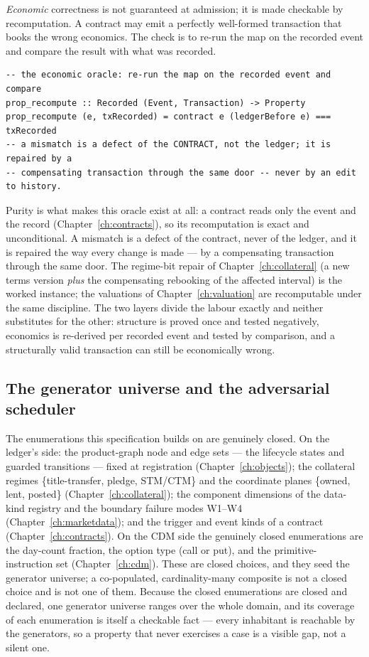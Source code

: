 \emph{Economic} correctness is not guaranteed at admission; it is made checkable by
recomputation. A contract may emit a perfectly well-formed transaction that books the wrong
economics. The check is to re-run the map on the recorded event and compare the result with
what was recorded.

\begin{lstlisting}
-- the economic oracle: re-run the map on the recorded event and compare
prop_recompute :: Recorded (Event, Transaction) -> Property
prop_recompute (e, txRecorded) = contract e (ledgerBefore e) === txRecorded
-- a mismatch is a defect of the CONTRACT, not the ledger; it is repaired by a
-- compensating transaction through the same door -- never by an edit to history.
\end{lstlisting}

Purity is what makes this oracle exist at all: a contract reads only the event and the
record (Chapter~\ref{ch:contracts}), so its recomputation is exact and unconditional. A
mismatch is a defect of the contract, never of the ledger, and it is repaired the way every
change is made --- by a compensating transaction through the same door. The regime-bit
repair of Chapter~\ref{ch:collateral} (a new terms version \emph{plus} the compensating
rebooking of the affected interval) is the worked instance; the valuations of
Chapter~\ref{ch:valuation} are recomputable under the same discipline. The two layers
divide the labour exactly and neither substitutes for the other: structure is proved once
and tested negatively, economics is re-derived per recorded event and tested by comparison,
and a structurally valid transaction can still be economically wrong.

\subsection{The generator universe and the adversarial scheduler}

The enumerations this specification builds on are genuinely closed. On the ledger's side:
the product-graph node and edge sets --- the lifecycle states and guarded transitions ---
fixed at registration (Chapter~\ref{ch:objects}); the collateral regimes
\{title-transfer, pledge, STM/CTM\} and the coordinate planes \{owned, lent, posted\}
(Chapter~\ref{ch:collateral}); the component dimensions of the data-kind registry and the
boundary failure modes W1--W4 (Chapter~\ref{ch:marketdata}); and the trigger and event
kinds of a contract (Chapter~\ref{ch:contracts}). On the CDM side the genuinely closed
enumerations are the day-count fraction, the option type (call or put), and the
primitive-instruction set (Chapter~\ref{ch:cdm}). These are closed choices, and they seed
the generator universe; a co-populated, cardinality-many composite is not a closed choice
and is not one of them. Because the closed enumerations are closed and declared, one
generator universe ranges over the whole domain, and its coverage of each enumeration is
itself a checkable fact --- every inhabitant is reachable by the generators, so a property
that never exercises a case is a visible gap, not a silent one.

